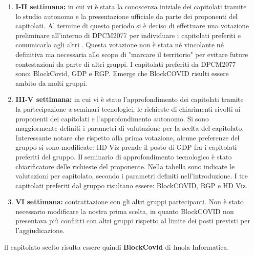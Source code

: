 \begin{enumerate}
\item \textbf{I-II settimana:} in cui vi è stata la conoscenza iniziale dei capitolati tramite lo studio autonomo e la presentazione ufficiale da parte dei proponenti del capitolati. Al termine di questo periodo si è deciso di effettuare una votazione preliminare all'interno di DPCM2077 per individuare i capitolati preferiti e comunicarla agli altri . Questa votazione non è stata né vincolante né definitiva ma necessaria allo scopo di "marcare il territorio" per evitare future contestazioni da parte di altri gruppi. I capitolati preferiti da DPCM2077 sono: BlockCovid, GDP e RGP. Emerge che BlockCOVID risulti essere ambito da molti gruppi.  
\item \textbf{III-V settimana:} in cui vi è stato l'approfondimento dei capitolati tramite la partecipazione a seminari tecnologici, le richieste di chiarimenti rivolti ai proponenti dei capitolati e l'approfondimento autonomo. Si sono maggiormente definiti i parametri di valutazione per la scelta del capitolato. Interessante notare che rispetto alla prima votazione, alcune preferenze del gruppo si sono modificate: HD Viz prende il posto di GDP fra i capitolati preferiti del gruppo. Il seminario di approfondimento tecnologico è stato chiarificatore delle richieste del proponente. Nella tabella sono indicate le valutazioni per capitolato, secondo i parametri definiti nell'introduzione. I tre capitolati preferiti dal gruppo risultano essere: BlockCOVID, RGP e HD Viz.
\item \textbf{VI settimana:} contrattazione con gli altri gruppi partecipanti. Non è stato necessario modificare la nostra prima scelta, in quanto BlockCOVID non presentava più conflitti con altri gruppi rispetto al limite dei posti previsti per l'aggiudicazione.
\end{enumerate}

Il capitolato scelto risulta essere quindi \textbf{BlockCovid} di Imola Informatica.